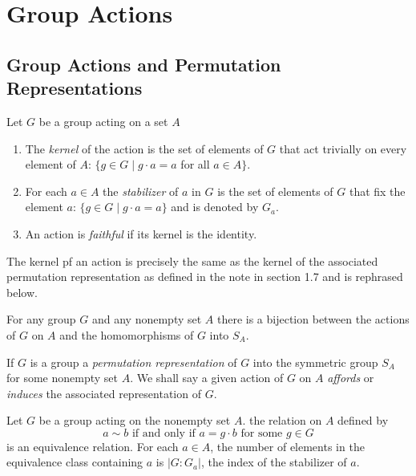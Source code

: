 \documentclass[../main]{subfiles}
\begin{document}
 
 
 \section{Group Actions}
 
 
 \subsection{Group Actions and Permutation Representations}
 
 
 \begin{dfn} Let $G$ be a group acting on a set $A$
  \begin{enumerate}
    \item The \textit{kernel} of the action is the set of elements of $G$ that act trivially on every element of $A$: $\{g\in G \mid g \cdot a = a $ for all $a\in A\}$.
    \item For each $a\in A$ the \textit{stabilizer} of $a$ in $G$ is the set of elements of $G$ that fix the element $a$: $\{g\in G \mid g\cdot a = a\}$ and is denoted by $G_a$.
    \item An action is \textit{faithful} if its kernel is the identity.
   \end{enumerate}
 \end{dfn}
 
 
 \begin{nt}
  The kernel pf an action is precisely the same as the kernel of the associated permutation representation as defined in the note in section 1.7 and is rephrased below. 
 \end{nt}
 
 
 \begin{prop}
  For any group $G$ and any nonempty set $A$ there is a bijection between the actions of $G$ on $A$ and the homomorphisms of $G$ into $S_A$.
 \end{prop}
 
 
 \begin{dfn}
  If $G$ is a group a \textit{permutation representation} of $G$ into the symmetric group $S_A$ for some nonempty set $A$. We shall say a given action of $G$ on $A$ \textit{affords} or \textit{induces} the associated representation of $G$. 
 \end{dfn}
 
 
 \begin{prop}
  Let $G$ be a group acting on the nonempty set $A$. the relation on $A$ defined by 
  \[a\sim b \text{ if and only if } a=g\cdot b \text{ for some } g\in G\]
  is an equivalence relation. For each $a\in A$, the number of elements in the equivalence class containing $a$ is $|G:G_a|$, the index of the stabilizer of $a$.
 \end{prop}
 
\end{document}
